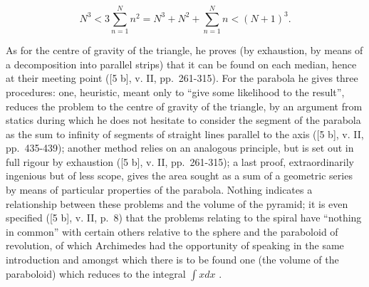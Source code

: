 \[
N ^ {3} <   3 \sum_ {n = 1} ^ {N} n ^ {2} = N ^ {3} + N ^ {2} + \sum_ {n = 1} ^ {N} n <   (N + 1) ^ {3}.
\]

As for the centre of gravity of the triangle, he proves (by exhaustion, by means of a decomposition into parallel strips) that it can be found on each median, hence at their meeting point ({[}5 b{]}, v. II, pp.~261-315). For the parabola he gives three procedures: one, heuristic, meant only to ``give some likelihood to the result'', reduces the problem to the centre of gravity of the triangle, by an argument from statics during which he does not hesitate to consider the segment of the parabola as the sum to infinity of segments of straight lines parallel to the axis ({[}5 b{]}, v. II, pp.~435-439); another method relies on an analogous principle, but is set out in full rigour by exhaustion ({[}5 b{]}, v. II, pp.~261-315); a last proof, extraordinarily ingenious but of less scope, gives the area sought as a sum of a geometric series by means of particular properties of the parabola. Nothing indicates a relationship between these problems and the volume of the pyramid; it is even specified ({[}5 b{]}, v. II, p.~8) that the problems relating to the spiral have ``nothing in common'' with certain others relative to the sphere and the paraboloid of revolution, of which Archimedes had the opportunity of speaking in the same introduction and amongst which there is to be found one (the volume of the paraboloid) which reduces to the integral \(\int x dx\) .

